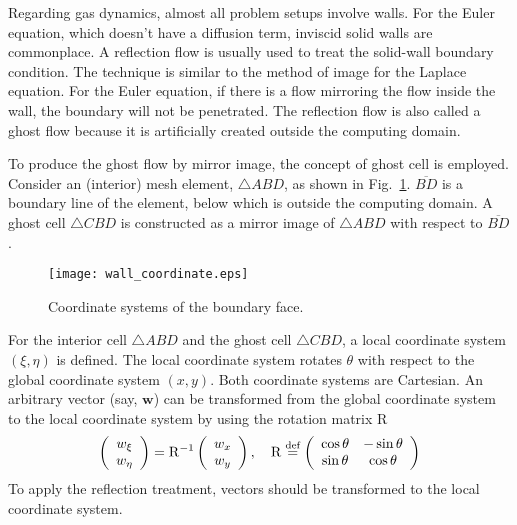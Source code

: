 \documentclass[a4paper,12pt,dvips]{article}
\newcommand*\defeq{\buildrel{\text{def}}\over{=}}
\begin{document}
Regarding gas dynamics, almost all problem setups involve walls.  For the Euler
equation, which doesn't have a diffusion term, inviscid solid walls are
commonplace.  A reflection flow is usually used to treat the solid-wall
boundary condition\cite{laney_computational_1998}.  The technique is similar to
the method of image for the Laplace equation.  For the Euler equation, if there
is a flow mirroring the flow inside the wall, the boundary will not be
penetrated.  The reflection flow is also called a ghost flow because it is
artificially created outside the computing domain.

To produce the ghost flow by mirror image, the concept of ghost cell is
employed.  Consider an (interior) mesh element, $\bigtriangleup ABD$, as shown
in Fig.~\ref{f:wall_coordinate}.  $\overline{BD}$ is a boundary line of the
element, below which is outside the computing domain.  A ghost cell
$\bigtriangleup CBD$ is constructed as a mirror image of $\bigtriangleup ABD$
with respect to $\overline{BD}$.

\begin{figure}[htbp]
\centering
\texttt{[image: wall\_coordinate.eps]}
\caption{Coordinate systems of the boundary face.}
\label{f:wall_coordinate}
\end{figure}

For the interior cell $\bigtriangleup ABD$ and the ghost cell $\bigtriangleup
CBD$, a local coordinate system $(\xi, \eta)$ is defined.  The local coordinate
system rotates $\theta$ with respect to the global coordinate system $(x, y)$.
Both coordinate systems are Cartesian.  An arbitrary vector (say, $\mathbf{w}$)
can be transformed from the global coordinate system to the local coordinate
system by using the rotation matrix $\mathrm{R}$
\begin{align*}
\left(\begin{array}{c} w_{\xi} \\ w_{\eta} \end{array}\right)
= \mathrm{R}^{-1}
\left(\begin{array}{c} w_x \\ w_y \end{array}\right), \quad
\mathrm{R} \defeq \left(\begin{array}{cc}
  \cos\theta & -\sin\theta \\ \sin\theta & \cos\theta
\end{array}\right)
\end{align*}
To apply the reflection treatment, vectors should be transformed to the local
coordinate system.
\end{document}
